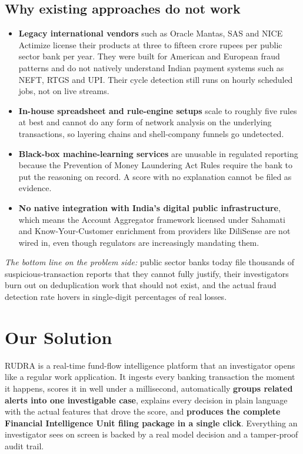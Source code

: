 \documentclass[10pt,a4paper]{article}
\begin{document}
\subsection*{Why existing approaches do not work}
\begin{itemize}
  \item \textbf{Legacy international vendors} such as Oracle Mantas, SAS and NICE Actimize license their products at three to fifteen crore rupees per public sector bank per year. They were built for American and European fraud patterns and do not natively understand Indian payment systems such as NEFT, RTGS and UPI. Their cycle detection still runs on hourly scheduled jobs, not on live streams.
  \item \textbf{In-house spreadsheet and rule-engine setups} scale to roughly five rules at best and cannot do any form of network analysis on the underlying transactions, so layering chains and shell-company funnels go undetected.
  \item \textbf{Black-box machine-learning services} are unusable in regulated reporting because the Prevention of Money Laundering Act Rules require the bank to put the reasoning on record. A score with no explanation cannot be filed as evidence.
  \item \textbf{No native integration with India's digital public infrastructure}, which means the Account Aggregator framework licensed under Sahamati and Know-Your-Customer enrichment from providers like DiliSense are not wired in, even though regulators are increasingly mandating them.
\end{itemize}

\noindent\textit{The bottom line on the problem side:} public sector banks today file thousands of suspicious-transaction reports that they cannot fully justify, their investigators burn out on deduplication work that should not exist, and the actual fraud detection rate hovers in single-digit percentages of real losses.

\newpage

\section*{Our Solution}

RUDRA is a real-time fund-flow intelligence platform that an investigator opens like a regular work application. It ingests every banking transaction the moment it happens, scores it in well under a millisecond, automatically \textbf{groups related alerts into one investigable case}, explains every decision in plain language with the actual features that drove the score, and \textbf{produces the complete Financial Intelligence Unit filing package in a single click}. Everything an investigator sees on screen is backed by a real model decision and a tamper-proof audit trail.
\end{document}

